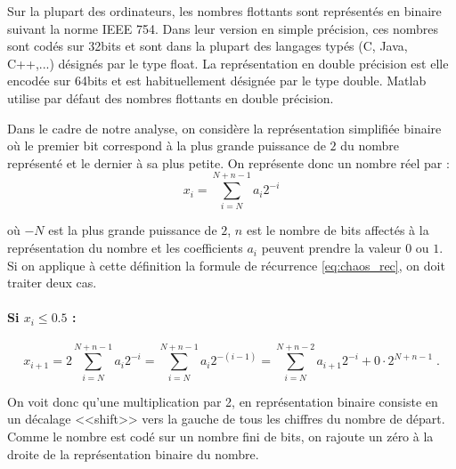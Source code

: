 \documentclass[a4paper, 12pt]{report}
\newcommand{\code}[1]{\textsf{#1}}
\begin{document}

Sur la plupart des ordinateurs, les nombres flottants sont représentés
en binaire suivant la norme IEEE 754. Dans leur version en simple précision,
ces nombres sont codés sur 32bits et sont dans la plupart des langages typés
(C, Java, C++,...) désignés par le type \code{float}. La représentation en
double précision est elle encodée sur 64bits et est habituellement désignée
par le type \code{double}. Matlab utilise par défaut des nombres flottants en double précision.


Dans le cadre de notre analyse, on considère la représentation simplifiée binaire où le premier bit correspond à la plus grande puissance de $2$ du nombre représenté et le dernier à sa plus petite. On représente donc un nombre réel par :
\begin{equation}
x_i = \sum_{i=N}^{N+n-1} a_i 2^{-i}
\end{equation}

où $-N$ est la plus grande puissance de $2$, $n$ est le nombre de bits affectés à la représentation du nombre  et les coefficients $a_i$ peuvent prendre la valeur $0$ ou $1$. Si on applique à cette définition la formule de récurrence \eqref{eq:chaos_rec}, on doit traiter deux cas.

\paragraph{Si $x_i \le 0.5$ :}

\begin{equation}
x_{i+1} = 2 \sum_{i=N}^{N+n-1} a_i 2^{-i} = \sum_{i=N}^{N+n-1} a_i 2^{-(i-1)} = \sum_{i=N}^{N+n-2} a_{i+1} 2^{-i}+0 \cdot 2^{N+n-1}\;.
\end{equation}

On voit donc qu'une multiplication par 2, en représentation binaire consiste en un décalage <<shift>> vers la gauche de tous les chiffres du nombre de départ. Comme le nombre est codé sur un nombre fini de bits, on rajoute un zéro à la droite de la représentation binaire du nombre.
\end{document}
